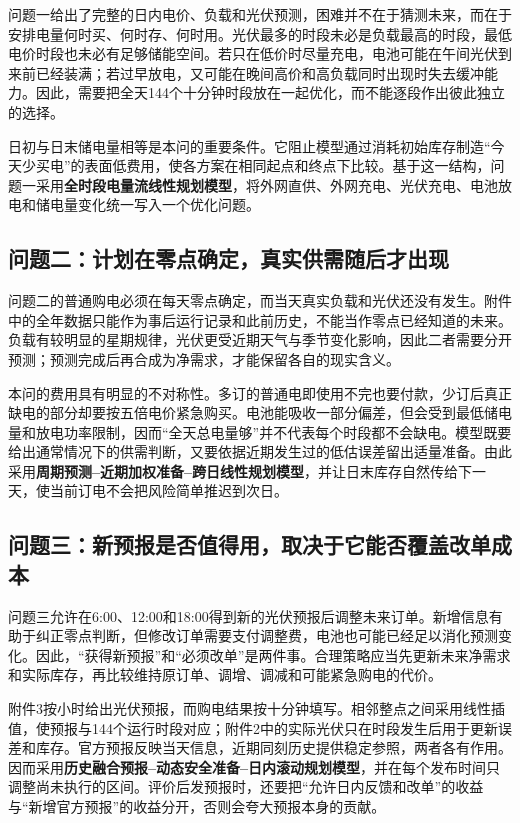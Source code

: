 \documentclass[11pt,a4paper]{article}
\begin{document}
问题一给出了完整的日内电价、负载和光伏预测，困难并不在于猜测未来，而在于安排电量何时买、何时存、何时用。光伏最多的时段未必是负载最高的时段，最低电价时段也未必有足够储能空间。若只在低价时尽量充电，电池可能在午间光伏到来前已经装满；若过早放电，又可能在晚间高价和高负载同时出现时失去缓冲能力。因此，需要把全天144个十分钟时段放在一起优化，而不能逐段作出彼此独立的选择。

日初与日末储电量相等是本问的重要条件。它阻止模型通过消耗初始库存制造“今天少买电”的表面低费用，使各方案在相同起点和终点下比较。基于这一结构，问题一采用\textbf{全时段电量流线性规划模型}，将外网直供、外网充电、光伏充电、电池放电和储电量变化统一写入一个优化问题。

\subsection{问题二：计划在零点确定，真实供需随后才出现}

问题二的普通购电必须在每天零点确定，而当天真实负载和光伏还没有发生。附件中的全年数据只能作为事后运行记录和此前历史，不能当作零点已经知道的未来。负载有较明显的星期规律，光伏更受近期天气与季节变化影响，因此二者需要分开预测；预测完成后再合成为净需求，才能保留各自的现实含义。

本问的费用具有明显的不对称性。多订的普通电即使用不完也要付款，少订后真正缺电的部分却要按五倍电价紧急购买。电池能吸收一部分偏差，但会受到最低储电量和放电功率限制，因而“全天总电量够”并不代表每个时段都不会缺电。模型既要给出通常情况下的供需判断，又要依据近期发生过的低估误差留出适量准备。由此采用\textbf{周期预测--近期加权准备--跨日线性规划模型}，并让日末库存自然传给下一天，使当前订电不会把风险简单推迟到次日。

\subsection{问题三：新预报是否值得用，取决于它能否覆盖改单成本}

问题三允许在6:00、12:00和18:00得到新的光伏预报后调整未来订单。新增信息有助于纠正零点判断，但修改订单需要支付调整费，电池也可能已经足以消化预测变化。因此，“获得新预报”和“必须改单”是两件事。合理策略应当先更新未来净需求和实际库存，再比较维持原订单、调增、调减和可能紧急购电的代价。

附件3按小时给出光伏预报，而购电结果按十分钟填写。相邻整点之间采用线性插值，使预报与144个运行时段对应；附件2中的实际光伏只在时段发生后用于更新误差和库存。官方预报反映当天信息，近期同刻历史提供稳定参照，两者各有作用。因而采用\textbf{历史融合预报--动态安全准备--日内滚动规划模型}，并在每个发布时间只调整尚未执行的区间。评价后发预报时，还要把“允许日内反馈和改单”的收益与“新增官方预报”的收益分开，否则会夸大预报本身的贡献。
\end{document}
